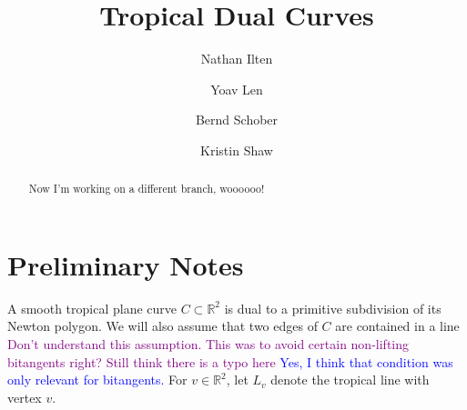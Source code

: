 \documentclass[oneside]{amsart}
\title{Tropical Dual Curves}
\author{Nathan Ilten}
\author{Yoav Len}
\author{Bernd Schober}
\author{Kristin Shaw}
\newcommand{\RR}{\mathbb{R}}
\theoremstyle{definition}
\newcommand{\yoav}[1]{\textcolor{blue}{#1}}
\newcommand{\kristin}[1]{\textcolor{purple}{#1}}
\begin{document}
\begin{abstract}
Now I'm working on a different branch, woooooo!

\end{abstract}
\maketitle
\section{Preliminary Notes}
A smooth tropical plane curve $C\subset \mathbb{R}^2$ is dual to a primitive
subdivision of its Newton polygon. We will also assume that  two edges  of $C$
are contained in a line  \kristin{Don't understand this assumption. This was to
avoid certain non-lifting bitangents right?
Still think there is a typo here} \yoav{Yes, I think that condition was only relevant for bitangents.} For $v\in\RR^2$, let
$L_v$ denote the tropical line with vertex $v$.
\end{document}

